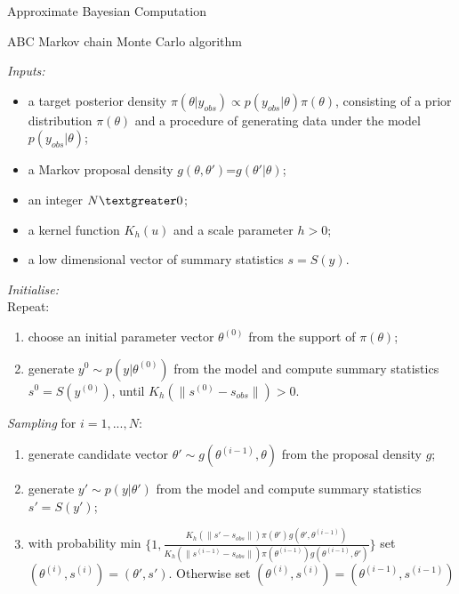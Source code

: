 \documentclass{beamer}
\begin{document}
\begin{section}{Approximate Bayesian Computation}
	
	\begin{frame}[plain]{}
		\sectionpage
	\end{frame}
	
\begin{frame}{ABC Markov chain Monte Carlo algorithm}
	\only<1> {
		\emph{Inputs:}
		\begin{itemize}
			\item a target posterior density $\pi(\theta | y_{obs}) \propto p(y_{obs}|\theta) \pi(\theta)$, consisting of a prior distribution $\pi(\theta)$ and a procedure of generating data under the model $p(y_{obs}|\theta)$;
			\item a Markov proposal density $g(\theta,\theta')$=$g(\theta' | \theta)$;
			\item an integer $N \textgreater0$;
			\item a kernel function $K_h(u)$ and a scale parameter $h > 0$;
			\item a low dimensional vector of summary statistics $s=S(y)$.
		\end{itemize}

		\emph{Initialise:} 
		\\Repeat:
		\begin{enumerate}
			\item choose an initial parameter vector $\theta^{(0)}$ from the support of $\pi(\theta)$;
			\item generate $ y^{0} \sim p(y|\theta ^ {(0)})$ from the model and compute summary statistics $s^{0}=S(y^{(0)})$, until ${K_h(\parallel s^{(0)}-s_{obs}\parallel)} >0$.
		\end{enumerate}
	}
	 {
		\emph{Sampling} for $i=1,...,N$:
		\begin{enumerate}
			\item generate candidate vector $\theta' \sim g(\theta^{(i-1)},\theta)$ from the proposal density $g$;
			\item generate $ y' \sim p(y|\theta')$ from the model and compute summary statistics  $s' = S(y')$;
			\item with probability min  $ \{ 1, \frac{K_h(\parallel s'-s_{obs}\parallel)   \pi(\theta')g(\theta',\theta^{(i-1)})}{K_h(\parallel s^{(i-1)}-s_{obs}\parallel)   \pi(\theta^{(i-1)})g(\theta^{(i-1)},\theta') } \}$ set $(\theta^{(i)},s^{(i)})=(	\theta',s')$. Otherwise set  $(\theta^{(i)},s^{(i)})=(\theta^{(i-1)},s^{(i-1)})$
		\end{enumerate}
	
}
\end{frame}
\end{section}
\end{document}
